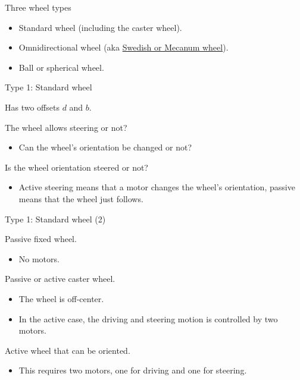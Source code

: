 \documentclass[compress]{beamer}
\begin{document}
\begin{frame}{Three wheel types}

\begin{itemize}
    \item Standard wheel (including the caster wheel).
    \item Omnidirectional wheel (aka \href{http://en.wikipedia.org/wiki/Mecanum_wheel}{Swedish or Mecanum wheel}).
    \item Ball or spherical wheel.
\end{itemize}

\end{frame}

\begin{frame}{Type 1: Standard wheel}

Has two offsets $d$ and $b$.

The wheel allows steering or not?

\begin{itemize}
    \item Can the wheel's orientation be changed or not?
\end{itemize}

Is the wheel orientation steered or not?

\begin{itemize}
    \item Active steering means that a motor changes the wheel's orientation,
  passive means that the wheel just follows.
\end{itemize}

\end{frame}

\begin{frame}{Type 1: Standard wheel (2)}

Passive fixed wheel.

\begin{itemize}
    \item No motors.
\end{itemize}

Passive or active caster wheel.

\begin{itemize}
    \item The wheel is off-center.
    \item In the active case, the driving and steering motion is controlled by
  two motors.
\end{itemize}

Active wheel that can be oriented.

\begin{itemize}
    \item This requires two motors, one for driving and one for steering.
\end{itemize}

\end{frame}
\end{document}
